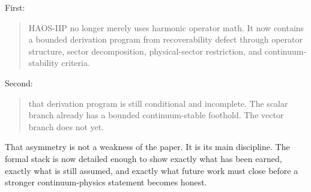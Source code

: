 \documentclass[11pt]{article}
\begin{document}
First:
\begin{quote}
HAOS-IIP no longer merely uses harmonic operator math. It now contains a bounded derivation program from recoverability defect through operator structure, sector decomposition, physical-sector restriction, and continuum-stability criteria.
\end{quote}

Second:
\begin{quote}
that derivation program is still conditional and incomplete. The scalar branch already has a bounded continuum-stable foothold. The vector branch does not yet.
\end{quote}

That asymmetry is not a weakness of the paper. It is its main discipline. The formal stack is now detailed enough to show exactly what has been earned, exactly what is still assumed, and exactly what future work must close before a stronger continuum-physics statement becomes honest.
\end{document}
